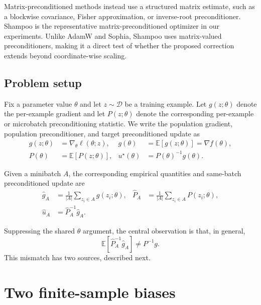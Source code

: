 \documentclass{article}
\newcommand{\E}{\mathbb{E}}
\newcommand{\D}{\mathcal{D}}
\begin{document}
Matrix-preconditioned methods instead use a structured matrix estimate, such as a blockwise covariance, Fisher approximation, or inverse-root preconditioner. Shampoo is the representative matrix-preconditioned optimizer in our experiments. Unlike AdamW and Sophia, Shampoo uses matrix-valued preconditioners, making it a direct test of whether the proposed correction extends beyond coordinate-wise scaling.

\subsection{Problem setup}
\label{sec:problem-setup}

Fix a parameter value $\theta$ and let $z \sim \D$ be a training example. Let $g(z;\theta)$ denote the per-example gradient and let $P(z;\theta)$ denote the corresponding per-example or microbatch preconditioning statistic. We write the population gradient, population preconditioner, and target preconditioned update as
\begin{equation}
    \begin{aligned}
    g(z;\theta) &= \nabla_\theta \ell(\theta;z),
    &
    g(\theta) &= \E[g(z;\theta)] = \nabla f(\theta), \\
    P(\theta) &= \E[P(z;\theta)],
    &
    u^\star(\theta) &= P(\theta)^{-1} g(\theta).
    \end{aligned}
\end{equation}

Given a minibatch $A$, the corresponding empirical quantities and same-batch preconditioned update are
\begin{equation}
    \begin{aligned}
    \hat g_A &= \frac{1}{|A|}\sum_{z_i \in A} g(z_i;\theta),
    &
    \hat P_A &= \frac{1}{|A|}\sum_{z_i \in A} P(z_i;\theta), \\
    \hat u_A &= \hat P_A^{-1}\hat g_A.
    \end{aligned}
\end{equation}

Suppressing the shared $\theta$ argument, the central observation is that, in general,
\begin{equation}
    \E[\hat P_A^{-1}\hat g_A]
    \neq
    P^{-1}g.
    \label{eq:not-unbiased}
\end{equation}
This mismatch has two sources, described next.

\section{Two finite-sample biases}
\label{sec:two-biases}
\end{document}
